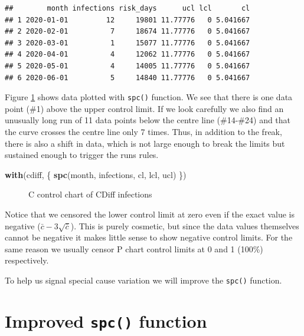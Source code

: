\documentclass[
]{book}
\makeatletter
\newenvironment{Shaded}{\begin{snugshade}}{\end{snugshade}}
\newcommand{\FunctionTok}[1]{\textcolor[rgb]{0.13,0.29,0.53}{\textbf{#1}}}
\newcommand{\NormalTok}[1]{#1}
\newcommand*\pandocbounded[1]{%
  \sbox\pandoc@box{#1}%
  \Gscale@div\@tempa{\textheight}{\dimexpr\ht\pandoc@box+\dp\pandoc@box\relax}%
  \Gscale@div\@tempb{\linewidth}{\wd\pandoc@box}%
  \ifdim\@tempb\p@<\@tempa\p@\let\@tempa\@tempb\fi%
  \ifdim\@tempa\p@<\p@\scalebox{\@tempa}{\usebox\pandoc@box}%
  \else\usebox{\pandoc@box}%
  \fi%
}
\makeatother
\begin{document}
\begin{verbatim}
##        month infections risk_days      ucl lcl       cl
## 1 2020-01-01         12     19801 11.77776   0 5.041667
## 2 2020-02-01          7     18674 11.77776   0 5.041667
## 3 2020-03-01          1     15077 11.77776   0 5.041667
## 4 2020-04-01          4     12062 11.77776   0 5.041667
## 5 2020-05-01          4     14005 11.77776   0 5.041667
## 6 2020-06-01          5     14840 11.77776   0 5.041667
\end{verbatim}

Figure \ref{fig:highlighting-spc1} shows data plotted with \texttt{spc()} function. We see that there is one data point (\#1) above the upper control limit. If we look carefully we also find an unusually long run of 11 data points below the centre line (\#14-\#24) and that the curve crosses the centre line only 7 times. Thus, in addition to the freak, there is also a shift in data, which is not large enough to break the limits but sustained enough to trigger the runs rules.

\begin{Shaded}
\begin{Highlighting}[]
\FunctionTok{with}\NormalTok{(cdiff, \{}
  \FunctionTok{spc}\NormalTok{(month, infections, cl, lcl, ucl)}
\NormalTok{\})}
\end{Highlighting}
\end{Shaded}

\begin{figure}
\centering
\pandocbounded{}
\caption{\label{fig:highlighting-spc1}C control chart of CDiff infections}
\end{figure}

Notice that we censored the lower control limit at zero even if the exact value is negative (\(\bar{c}-3\sqrt{\bar{c}}\)). This is purely cosmetic, but since the data values themselves cannot be negative it makes little sense to show negative control limits. For the same reason we usually censor P chart control limits at 0 and 1 (100\%) respectively.

To help us signal special cause variation we will improve the \texttt{spc()} function.

\section{\texorpdfstring{Improved \texttt{spc()} function}{Improved spc() function}}\label{improved-spc-function}
\end{document}

